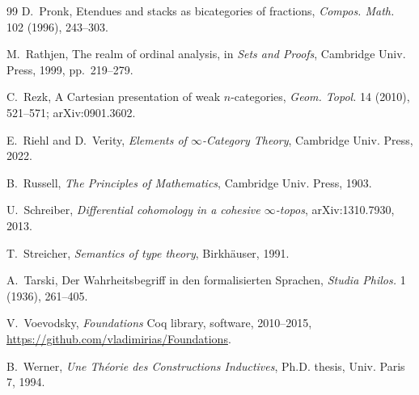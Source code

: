 \documentclass[11pt]{article}
\theoremstyle{plain}
\theoremstyle{definition}
\begin{document}
\begin{thebibliography}{99}
D.~Pronk,
\newblock Etendues and stacks as bicategories of fractions,
\newblock \emph{Compos. Math.} 102 (1996), 243--303.

M.~Rathjen,
\newblock The realm of ordinal analysis,
\newblock in \emph{Sets and Proofs}, Cambridge Univ. Press, 1999, pp.~219--279.

C.~Rezk,
\newblock A Cartesian presentation of weak $n$-categories,
\newblock \emph{Geom. Topol.} 14 (2010), 521--571; arXiv:0901.3602.

E.~Riehl and D.~Verity,
\newblock \emph{Elements of $\infty$-Category Theory},
\newblock Cambridge Univ. Press, 2022.

B.~Russell,
\newblock \emph{The Principles of Mathematics},
\newblock Cambridge Univ. Press, 1903.

U.~Schreiber,
\newblock \emph{Differential cohomology in a cohesive $\infty$-topos},
\newblock arXiv:1310.7930, 2013.

T.~Streicher,
\newblock \emph{Semantics of type theory},
\newblock Birkh\"auser, 1991.

A.~Tarski,
\newblock Der Wahrheitsbegriff in den formalisierten Sprachen,
\newblock \emph{Studia Philos.} 1 (1936), 261--405.

V.~Voevodsky,
\newblock \emph{Foundations} Coq library,
\newblock software, 2010--2015,
\newblock \url{https://github.com/vladimirias/Foundations}.

B.~Werner,
\newblock \emph{Une Th\'eorie des Constructions Inductives},
\newblock Ph.D. thesis, Univ. Paris 7, 1994.

\end{thebibliography}
\end{document}
